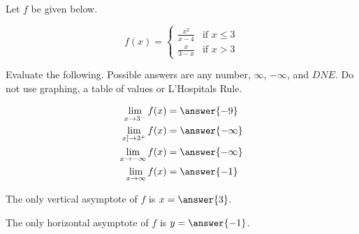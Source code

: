 \documentclass{ximera}
\author{Nela Lakos \and Kyle Parsons}
\begin{document}
\begin{exercise}

Let $f$ be given below.

\[
f(x) = 
\begin{cases}
\frac{x^2}{x-4} & \text{if } x\leq3\\
\frac{x}{3-x} & \text{if } x>3
\end{cases}
\]

Evaluate the following.  Possible answers are any number, $\infty$, $-\infty$, and $DNE$.  Do not use graphing, a table of values or L'Hospitals Rule.

\begin{align*}
\lim_{x\to3^-}f(x) &= \answer{-9}\\
\lim_{x]\to3^+}f(x) &= \answer{-\infty}\\
\lim_{x\to-\infty}f(x) &= \answer{-\infty}\\
\lim_{x\to\infty}f(x) &= \answer{-1}
\end{align*}

\begin{exercise}

The only vertical asymptote of $f$ is $x=\answer{3}$.

\begin{exercise}

The only horizontal asymptote of $f$ is $y=\answer{-1}$.

\end{exercise}
\end{exercise}
\end{exercise}
\end{document}
